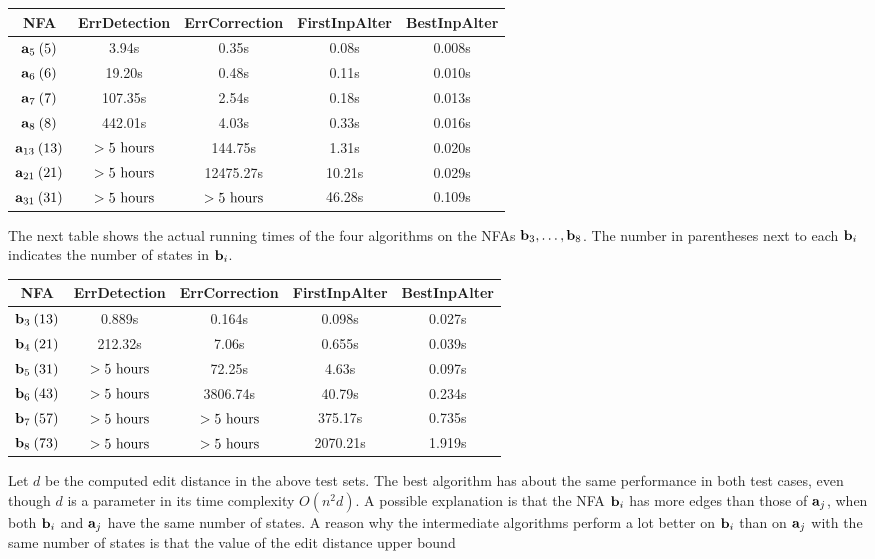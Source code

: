 \documentclass{article}
\theoremstyle{plain}
\theoremstyle{definition}
\theoremstyle{remark}
\newcommand\pmsi{\par\medskip\indent}
\newcommand\pbsn{\par\bigskip\noindent}
\begin{document}
\pmsi
\begin{tabular}{|c|c|c|c|c|}\hline
NFA & ErrDetection & ErrCorrection  &  FirstInpAlter
& BestInpAlter\\  \hline
$\mathbf{a}_5\>(5)$ &  3.94s & 0.35s & 0.08s & 0.008s  \\  \hline
$\mathbf{a}_6\>(6)$ & 19.20s & 0.48s & 0.11s & 0.010s  \\  \hline
$\mathbf{a}_7\>(7)$ & 107.35s & 2.54s & 0.18s & 0.013s  \\  \hline
$\mathbf{a}_8\>(8)$ & 442.01s & 4.03s & 0.33s & 0.016s  \\  \hline
$\mathbf{a}_{13}\>(13)$ & $> 5 \hbox{ hours}$ & 144.75s & 1.31s & 0.020s  \\  \hline
$\mathbf{a}_{21}\>(21)$ & $> 5 \hbox{ hours}$ & 12475.27s & 10.21s & 0.029s  \\  \hline
$\mathbf{a}_{31}\>(31)$ & $> 5 \hbox{ hours}$ & $> 5 \hbox{ hours}$ & 46.28s & 0.109s  \\  \hline
\end{tabular}
\pbsn
The next table shows the actual running times of the
four algorithms on the NFAs $\mathbf{b}_3,\ldots,\mathbf{b}_8$.
The number in parentheses next to each $\mathbf{b}_i$ indicates the number of states in $\mathbf{b}_i$.
\pmsi
\begin{tabular}{|c|c|c|c|c|}\hline
NFA & ErrDetection & ErrCorrection  &  FirstInpAlter
& BestInpAlter\\  \hline
$\mathbf{b}_3\>(13)$ & 0.889s & 0.164s & 0.098s & 0.027s  \\  \hline
$\mathbf{b}_4\>(21)$ & 212.32s & 7.06s & 0.655s & 0.039s  \\  \hline
$\mathbf{b}_5\>(31)$ & $>5 \hbox{ hours}$ & 72.25s & 4.63s & 0.097s  \\  \hline
$\mathbf{b}_6\>(43)$ & $>5 \hbox{ hours}$ & 3806.74s & 40.79s & 0.234s  \\  \hline
$\mathbf{b}_7\>(57)$ & $>5 \hbox{ hours}$ & $>5 \hbox{ hours}$ & 375.17s & 0.735s  \\  \hline
$\mathbf{b}_8\>(73)$ & $>5 \hbox{ hours}$ & $>5 \hbox{ hours}$ & 2070.21s & 1.919s  \\  \hline
\end{tabular}
\pbsn
Let $d$ be the computed edit distance in the above test
sets.
The best algorithm has about the same performance in both test cases, even though $d$ is a parameter in its time complexity $O(n^2 d)$.
A possible explanation is that the NFA $\mathbf{b}_i$ has more edges than those of $\mathbf{a}_j$, when both $\mathbf{b}_i$ and $\mathbf{a}_j$ have the same number of states.
A reason why the intermediate algorithms perform a lot better on  $\mathbf{b}_i$ than on $\mathbf{a}_j$ with the same number of states is that the value of the edit distance upper bound
\end{document}
